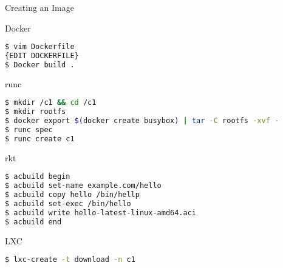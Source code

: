 \begin{frame}[fragile]{Creating an Image}

\begin{block}{Docker}
\begin{lstlisting}[language=bash,keywordstyle=\bf,stringstyle=\it,basicstyle=\tiny]
$ vim Dockerfile
{EDIT DOCKERFILE}
$ Docker build .
\end{lstlisting}
\end{block}

\begin{block}{runc}
\begin{lstlisting}[language=bash,keywordstyle=\bf,stringstyle=\it,basicstyle=\tiny]
$ mkdir /c1 && cd /c1
$ mkdir rootfs
$ docker export $(docker create busybox) | tar -C rootfs -xvf -
$ runc spec
$ runc create c1
\end{lstlisting}
\end{block}



\begin{block}{rkt}
\begin{lstlisting}[language=bash,keywordstyle=\bf,stringstyle=\it,basicstyle=\tiny]
$ acbuild begin
$ acbuild set-name example.com/hello
$ acbuild copy hello /bin/hellp
$ acbuild set-exec /bin/hello
$ acbuild write hello-latest-linux-amd64.aci
$ acbuild end
\end{lstlisting}
\end{block}

\begin{block}{LXC}
\begin{lstlisting}[language=bash,keywordstyle=\bf,stringstyle=\it,basicstyle=\tiny]
$ lxc-create -t download -n c1
\end{lstlisting}
\end{block}

\end{frame}